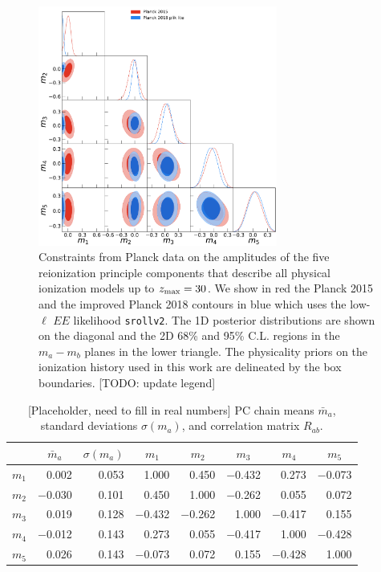 \documentclass[prd,twocolumn,amsmath,amssymb,floatfix,superscriptaddress,nofootinbib]{revtex4-1}
\begin{document}
\begin{widetext}

\begin{figure}
\includegraphics[width=0.7\textwidth]{results/pc_results/plot_mj_triangle_t18_r12_t19_t20_vs_pl18_pc_zmax30_pliklite.pdf}
\caption{Constraints from Planck data on the amplitudes of the five reionization principle components that describe all physical ionization models up to $z_{\rm max} = 30$. We show in red the Planck 2015 and the improved Planck 2018 contours in blue which uses the low-$\ell$ $EE$ likelihood \texttt{srollv2}. The 1D posterior distributions are shown on the diagonal and the 2D 68\% and 95\% C.L. regions in the $m_a-m_b$ planes in the lower triangle. The physicality priors on the ionization history used in this work are delineated by the box boundaries. [TODO: update legend]}
\label{fig:plot_mjs_2018_vs_2015}
\end{figure}

\end{widetext}

\begin{table}[b]
\centering
\caption{[Placeholder, need to fill in real numbers] PC chain means $\bar m_a$, standard deviations $\sigma(m_a)$, and correlation matrix $R_{ab}$.}
\label{tab:PC_stats}
\begin{tabular}{|r | r r@{\hskip 0.06in}|r r r r r|}
\hline
		
			  &  \multicolumn{1}{c}{$\bar m_a$} & \multicolumn{1}{c}{$\sigma(m_a)$}	 & \multicolumn{1}{|c}{$m_1$} & \multicolumn{1}{c}{$m_2$} & \multicolumn{1}{c}{$m_3$} & \multicolumn{1}{c}{$m_4$} & \multicolumn{1}{c|}{$m_5$} 
		\\ \hline
$m_1$ 
	& 0.002 & 0.053 & 1.000 & 0.450 & $-$0.432 & 0.273 & $-$0.073 \\ 
$m_2$ 
	& $-$0.030 &  0.101 & 0.450 & 1.000 & $-$0.262 & 0.055 & 0.072 \\ 
$m_3$ 
	& 0.019 &  0.128 & $-$0.432 & $-$0.262 &1.000 & $-$0.417 & 0.155 \\
$m_4$  
	& $-$0.012 & 0.143 &  0.273 & 0.055 & $-$0.417 & 1.000 & $-$0.428 \\ 
$m_5$ 
	& 0.026 & 0.143 & $-$0.073 & 0.072 & 0.155 & $-$0.428 & 1.000\\ \hline
\end{tabular}
\end{table}
\end{document}
